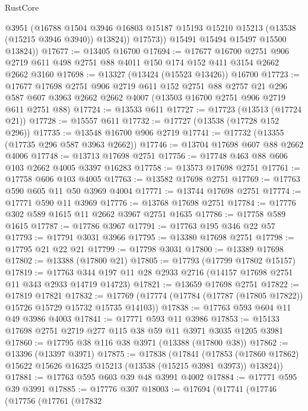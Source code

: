 \begin{lexlean}{RustCore}
\begin{coremodule}
              @3951
              (@16788
                @1504
                @3946
                @16803
                @15187
                @15193
                @15210
                @15213
                (@13538 (@15215 @3946 @3940))
                @13824))
            @17573))
        @15491
        @15494
        @15497
        @15500
        @13824))
@17677 := @13405 @16700
@17694 := @17677
    @16700
    @2751
    @906
    @2719
    @611
    @498
    @2751
    @88
    @4011
    @150
    @174
    @152
    @411
    @3154
    @2662
    @2662
    @3160
@17698 := @13327 (@13424 (@15523 @13426)) @16700
@17723 := @17677
    @17698
    @2751
    @906
    @2719
    @611
    @152
    @2751
    @88
    @2757
    @21
    @296
    @587
    @607
    @3963
    @2662
    @2662
    @4007
    (@13503 @16700 @2751 @906 @2719 @611 @2751 @88)
@17724 := @13533 @611
@17727 := @17723 (@13513 (@17724 @21))
@17728 := @15557 @611
@17732 := @17727 (@13538 (@17728 @152 @296))
@17735 := @13548 @16700 @906 @2719
@17741 := @17732 (@13355 (@17735 @296 @587 @3963 @2662))
@17746 := @13704 @17698 @607 @88 @2662 @4006
@17748 := @13713 @17698 @2751
@17756 := @17748 @463 @88 @606 @103 @2662 @4005 @3397 @16283
@17758 := @13573 @17698 @2751
@17761 := @17758 @606 @103 @4005
@17763 := @13582 @17698 @2751
@17769 := @17763 @590 @605 @11 @50 @3969 @4004
@17771 := @13744 @17698 @2751
@17774 := @17771 @590 @11 @3969
@17776 := @13768 @17698 @2751
@17784 := @17776 @302 @589 @1615 @11 @2662 @3967 @2751 @1635
@17786 := @17758 @589 @1615
@17787 := @17786 @3967
@17791 := @17763 @195 @346 @22 @57
@17793 := @17791 @3031 @3966
@17795 := @13380 @17698 @2751
@17798 := @17795 @21 @22 @21
@17799 := @17798 @3031
@17800 := @13389 @17698
@17802 := @13388 (@17800 @21)
@17805 := @17793 (@17799 @17802 @15157)
@17819 := @17763 @344 @197 @11 @28 @2933 @2716 (@14157 @17698 @2751 @11 @343 @2933 @14719 @14723)
@17821 := @13659 @17698 @2751
@17822 := @17819 @17821
@17832 := @17769 (@17774 (@17784 (@17787 (@17805 @17822)) @15726 @15729 @15732 @15735 @14103))
@17838 := @17763 @593 @604 @11 @49 @3986 @4003
@17841 := @17771 @593 @11 @3986
@17853 := @15133 @17698 @2751 @2719 @277 @115 @38 @59 @11 @3971 @3035 @1205 @3981
@17860 := @17795 @38 @116 @38 @3971 (@13388 (@17800 @38))
@17862 := @13396 (@13397 @3971)
@17875 := @17838
    (@17841
      (@17853 (@17860 @17862) @15622 @15626 @16325 @15213 (@13538 (@15215 @3981 @3973)) @13824))
@17881 := @17763 @595 @603 @39 @48 @3991 @4002
@17884 := @17771 @595 @39 @3991
@17885 := @17776 @307
@18003 := @17694
    (@17741
      (@17746
        (@17756
          (@17761
            (@17832

\end{coremodule}
\end{lexlean}
